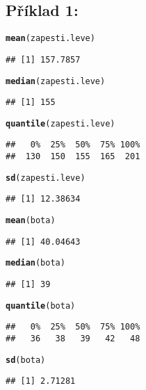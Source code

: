 \documentclass[twoside]{article}\usepackage[]{graphicx}\usepackage[]{color}
\makeatletter
\newcommand{\hlstd}[1]{\textcolor[rgb]{0.345,0.345,0.345}{#1}}%
\newcommand{\hlkwd}[1]{\textcolor[rgb]{0.737,0.353,0.396}{\textbf{#1}}}%
\newenvironment{kframe}{%
 \def\at@end@of@kframe{}%
 \ifinner\ifhmode%
  \def\at@end@of@kframe{\end{minipage}}%
  \begin{minipage}{\columnwidth}%
 \fi\fi%
 \def\FrameCommand##1{\hskip\@totalleftmargin \hskip-\fboxsep
 \colorbox{shadecolor}{##1}\hskip-\fboxsep
     \hskip-\linewidth \hskip-\@totalleftmargin \hskip\columnwidth}%
 \MakeFramed {\advance\hsize-\width
   \@totalleftmargin\z@ \linewidth\hsize
   \@setminipage}}%
 {\par\unskip\endMakeFramed%
 \at@end@of@kframe}
\newenvironment{knitrout}{}{} %
\makeatother
\begin{document}
\subsection*{Příklad 1:}
\begin{knitrout}
\color{fgcolor}\begin{kframe}
\begin{alltt}
\hlkwd{mean}\hlstd{(zapesti.leve)}
\end{alltt}
\begin{verbatim}
## [1] 157.7857
\end{verbatim}
\begin{alltt}
\hlkwd{median}\hlstd{(zapesti.leve)}
\end{alltt}
\begin{verbatim}
## [1] 155
\end{verbatim}
\begin{alltt}
\hlkwd{quantile}\hlstd{(zapesti.leve)}
\end{alltt}
\begin{verbatim}
##   0%  25%  50%  75% 100% 
##  130  150  155  165  201
\end{verbatim}
\begin{alltt}
\hlkwd{sd}\hlstd{(zapesti.leve)}
\end{alltt}
\begin{verbatim}
## [1] 12.38634
\end{verbatim}
\begin{alltt}
\hlkwd{mean}\hlstd{(bota)}
\end{alltt}
\begin{verbatim}
## [1] 40.04643
\end{verbatim}
\begin{alltt}
\hlkwd{median}\hlstd{(bota)}
\end{alltt}
\begin{verbatim}
## [1] 39
\end{verbatim}
\begin{alltt}
\hlkwd{quantile}\hlstd{(bota)}
\end{alltt}
\begin{verbatim}
##   0%  25%  50%  75% 100% 
##   36   38   39   42   48
\end{verbatim}
\begin{alltt}
\hlkwd{sd}\hlstd{(bota)}
\end{alltt}
\begin{verbatim}
## [1] 2.71281
\end{verbatim}
\end{kframe}
\end{knitrout}
\end{document}
